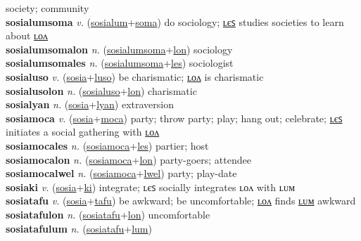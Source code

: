 society; community \label{sosialum} \\
\textbf{sosialumsoma} \textit{v.} (\hyperref[sosialum]{sosialum}+\hyperref[soma]{soma})
do sociology; \hyperref[sosialumsomales]{ʟєꜱ} studies societies to learn about \hyperref[sosialumsomalon]{ʟᴏᴧ} \label{sosialumsoma} \\
\textbf{sosialumsomalon} \textit{n.} (\hyperref[sosialumsoma]{sosialumsoma}+\hyperref[lon]{lon})
sociology \label{sosialumsomalon} \\
\textbf{sosialumsomales} \textit{n.} (\hyperref[sosialumsoma]{sosialumsoma}+\hyperref[les]{les})
sociologist \label{sosialumsomales} \\
\textbf{sosialuso} \textit{v.} (\hyperref[sosia]{sosia}+\hyperref[luso]{luso})
be charismatic; \hyperref[sosialusolon]{ʟᴏᴧ} is charismatic \label{sosialuso} \\
\textbf{sosialusolon} \textit{n.} (\hyperref[sosialuso]{sosialuso}+\hyperref[lon]{lon})
charismatic \label{sosialusolon} \\
\textbf{sosialyan} \textit{n.} (\hyperref[sosia]{sosia}+\hyperref[lyan]{lyan})
extraversion \label{sosialyan} \\
\textbf{sosiamoca} \textit{v.} (\hyperref[sosia]{sosia}+\hyperref[moca]{moca})
party; throw party; play; hang out; celebrate; \hyperref[sosiamocales]{ʟєꜱ} initiates a social gathering with \hyperref[sosiamocalon]{ʟᴏᴧ} \label{sosiamoca} \\
\textbf{sosiamocales} \textit{n.} (\hyperref[sosiamoca]{sosiamoca}+\hyperref[les]{les})
partier; host \label{sosiamocales} \\
\textbf{sosiamocalon} \textit{n.} (\hyperref[sosiamoca]{sosiamoca}+\hyperref[lon]{lon})
party-goers; attendee \label{sosiamocalon} \\
\textbf{sosiamocalwel} \textit{n.} (\hyperref[sosiamoca]{sosiamoca}+\hyperref[lwel]{lwel})
party; play-date \label{sosiamocalwel} \\
\textbf{sosiaki} \textit{v.} (\hyperref[sosia]{sosia}+\hyperref[ki]{ki})
integrate; ʟєꜱ socially integrates ʟᴏᴧ with ʟᴜᴍ \label{sosiaki} \\
\textbf{sosiatafu} \textit{v.} (\hyperref[sosia]{sosia}+\hyperref[tafu]{tafu})
be awkward; be uncomfortable; \hyperref[sosiatafulon]{ʟᴏᴧ} finds \hyperref[sosiatafulum]{ʟᴜᴍ} awkward \label{sosiatafu} \\
\textbf{sosiatafulon} \textit{n.} (\hyperref[sosiatafu]{sosiatafu}+\hyperref[lon]{lon})
uncomfortable \label{sosiatafulon} \\
\textbf{sosiatafulum} \textit{n.} (\hyperref[sosiatafu]{sosiatafu}+\hyperref[lum]{lum})
